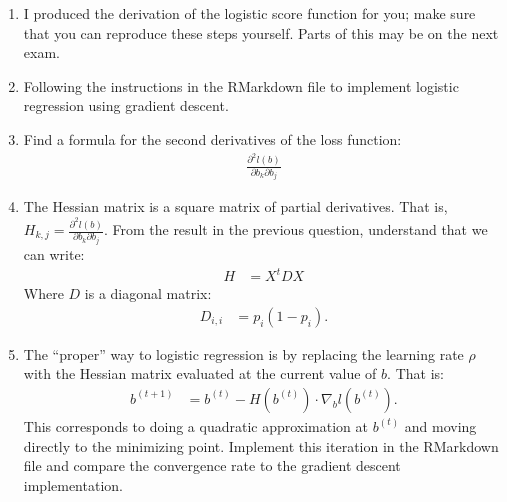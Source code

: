 \documentclass[12pt,hidelinks]{article}
\numberwithin{equation}{section}
\begin{document}
\begin{enumerate}
\item I produced the derivation of the logistic score function for you; make
sure that you can reproduce these steps yourself. Parts of this may be on the
next exam.
\item Following the instructions in the RMarkdown file to implement logistic
regression using gradient descent.
\item Find a formula for the second derivatives of the loss function:
\begin{align}
\frac{\partial^2 l(b)}{\partial b_k \partial b_j}
\end{align}
\item The Hessian matrix is a square matrix of partial derivatives. That is,
$H_{k, j} = \frac{\partial^2 l(b)}{\partial b_k \partial b_j}$. From the result
in the previous question, understand that we can write:
\begin{align}
H &= X^t D X
\end{align}
Where $D$ is a diagonal matrix:
\begin{align}
D_{i, i} &= p_i (1 - p_i).
\end{align}
\item The ``proper'' way to logistic regression is by replacing the learning
rate $\rho$ with the Hessian matrix evaluated at the current value of $b$.
That is:
\begin{align}
b^{(t+1)} &= b^{(t)} - H(b^{(t)}) \cdot \nabla_b l(b^{(t)}).
\end{align}
This corresponds to doing a quadratic approximation at $b^{(t)}$ and moving
directly to the minimizing point. Implement this iteration in the RMarkdown
file and compare the convergence rate to the gradient descent implementation.
\end{enumerate}
\end{document}
